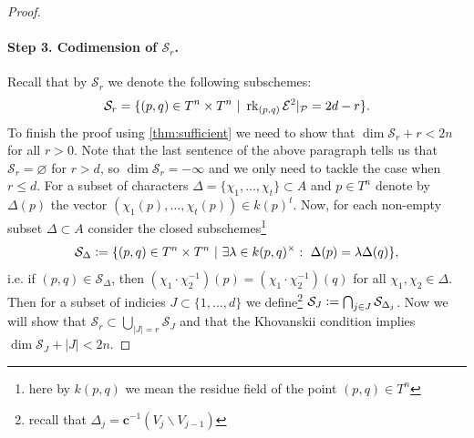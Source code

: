 \begin{proof}
    \paragraph{Step 3. Codimension of $\mathcal S_r$.} Recall that by $\mathcal S_r$ we denote the following subschemes: 
    \[
    \mathcal S_r = \{ (p, q) \in T^n \times T^n\ |\ \rk_{(p, q)} \E^2|_\P = 2d - r \}.
    \]
    To finish the proof using \autoref{thm:sufficient} we need to show that $\dim \mathcal S_r + r < 2n$ for all $r > 0$. Note that the last sentence of the above paragraph tells us that $\mathcal S_r = \varnothing$ for $r > d$, so $\dim \mathcal S_r = -\infty$ and we only need to tackle the case when $r \le d$. For a subset of characters $\Delta = \{ \chi_1, \dots, \chi_t \} \subset A$ and $p \in T^n$ denote by $\Delta(p)$ the vector $(\chi_1 (p), \dots, \chi_t(p)) \in k(p)^t$. Now, for each non-empty subset $\Delta \subset A$ consider the closed subschemes\footnote{here by $k(p, q)$ we mean the residue field of the point $(p, q) \in T^n$}
    \[
    \mathcal S_\Delta \vcentcolon= \{ (p, q) \in T^n \times T^n\ |\ \exists \lambda \in k(p, q)^\times:\  \Delta(p) = \lambda \Delta(q) \},
    \]
    i.e. if $(p, q) \in \mathcal S_\Delta$, then $(\chi_1 \cdot \chi_2^{-1}) (p) = (\chi_1 \cdot \chi_2^{-1}) (q)$ for all $\chi_1, \chi_2 \in \Delta$. Then for a subset of indicies $J \subset \{1, \dots, d\}$ we define\footnote{recall that $\Delta_j = \mathbf c^{-1} (V_j \backslash V_{j - 1})$} $\mathcal S_J \vcentcolon= \bigcap_{j \in J} \mathcal S_{\Delta_j}$. Now we will show that $\mathcal S_r \subset \bigcup_{|J| = r} \mathcal S_J$ and that the Khovanskii condition implies $\dim \mathcal S_J + |J| < 2n$. 


\end{proof}
